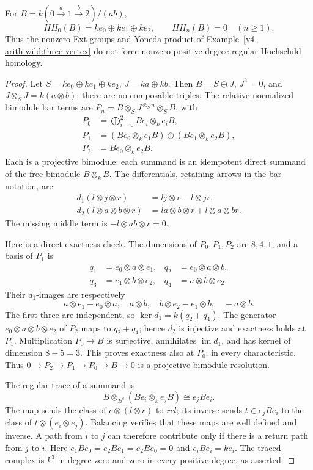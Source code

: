 \begin{proposition}
\label{v4-arith:wild:HH-three-vertex}
For \(B=k(0\xrightarrow a1\xrightarrow b2)/(ab)\),
\[
 HH_0(B)=ke_0\oplus ke_1\oplus ke_2,\qquad
 HH_n(B)=0\quad(n\ge1).
\]
Thus the nonzero Ext groups and Yoneda product of
Example~\ref{v4-arith:wild:three-vertex} do not force nonzero
positive-degree regular Hochschild homology.
\end{proposition}
\begin{proof}
Let \(S=ke_0\oplus ke_1\oplus ke_2\), \(J=ka\oplus kb\).
Then \(B=S\oplus J\), \(J^2=0\), and
\(J\otimes_SJ=k(a\otimes b)\); there are no composable triples.
The relative normalized bimodule bar terms are
\(P_n=B\otimes_SJ^{\otimes_Sn}\otimes_SB\), with
\begin{align*}
 P_0&=\bigoplus_{i=0}^2 Be_i\otimes_k e_iB,\\
 P_1&=(Be_0\otimes_k e_1B)\oplus(Be_1\otimes_k e_2B),\\
 P_2&=Be_0\otimes_k e_2B.
\end{align*}
Each is a projective bimodule: each summand is an idempotent direct
summand of the free bimodule \(B\otimes_kB\).
The differentials, retaining arrows in the bar notation, are
\begin{align*}
 d_1(l\otimes j\otimes r)&=lj\otimes r-l\otimes jr,\\
 d_2(l\otimes a\otimes b\otimes r)
 &=la\otimes b\otimes r+l\otimes a\otimes br.
\end{align*}
The missing middle term is \(-l\otimes ab\otimes r=0\).

Here is a direct exactness check. The dimensions of
\(P_0,P_1,P_2\) are \(8,4,1\), and a basis of \(P_1\) is
\begin{align*}
 q_1&=e_0\otimes a\otimes e_1,&
 q_2&=e_0\otimes a\otimes b,\\
 q_3&=e_1\otimes b\otimes e_2,&
 q_4&=a\otimes b\otimes e_2.
\end{align*}
Their \(d_1\)-images are respectively
\[
 a\otimes e_1-e_0\otimes a,\quad a\otimes b,\quad
 b\otimes e_2-e_1\otimes b,\quad -a\otimes b.
\]
The first three are independent, so \(\ker d_1=k(q_2+q_4)\).
The generator \(e_0\otimes a\otimes b\otimes e_2\) of \(P_2\)
maps to \(q_2+q_4\); hence \(d_2\) is injective and exactness
holds at \(P_1\). Multiplication \(P_0\to B\) is surjective,
annihilates \(\operatorname{im}d_1\), and has kernel of dimension
\(8-5=3\). This proves exactness also at \(P_0\), in every
characteristic. Thus \(0\to P_2\to P_1\to P_0\to B\to0\)
is a projective bimodule resolution.

The regular trace of a summand is
\[
 B\otimes_{B^e}(Be_i\otimes_k e_jB)\cong e_jBe_i.
\]
The map sends the class of \(c\otimes(l\otimes r)\) to \(rcl\);
its inverse sends \(t\in e_jBe_i\) to the class of
\(t\otimes(e_i\otimes e_j)\). Balancing verifies that these
maps are well defined and inverse. A path from \(i\) to \(j\)
can therefore contribute only if there is a return path from
\(j\) to \(i\). Here
\(e_1Be_0=e_2Be_1=e_2Be_0=0\) and \(e_iBe_i=ke_i\).
The traced complex is \(k^3\) in degree zero and zero in every
positive degree, as asserted.
\end{proof}


